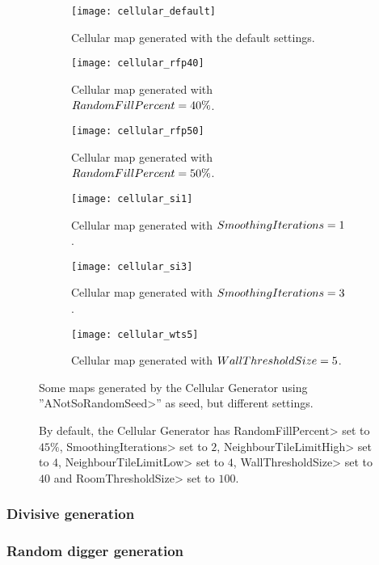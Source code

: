 \begin{figure}[tp]
	\centering
  	\begin{subfigure}[t]{0.325\linewidth}
		\texttt{[image: cellular\_default]}
     		\caption{Cellular map generated with the default settings.}
 	\end{subfigure}
  	\begin{subfigure}[t]{0.325\linewidth}
    		\texttt{[image: cellular\_rfp40]}
    		\caption{Cellular map generated with $Ran\-dom\-Fill\-Per\-cent = 40\%$.}
  	\end{subfigure}
  	\begin{subfigure}[t]{0.325\linewidth}
    		\texttt{[image: cellular\_rfp50]}
    		\caption{Cellular map generated with $Ran\-dom\-Fill\-Per\-cent = 50\%$.}
  	\end{subfigure}
  	\begin{subfigure}[t]{0.325\linewidth}
		\texttt{[image: cellular\_si1]}
     		\caption{Cellular map generated with $Smooth\-ing\-It\-er\-a\-tions = 1$.}
 	\end{subfigure}
  	\begin{subfigure}[t]{0.325\linewidth}
    		\texttt{[image: cellular\_si3]}
     		\caption{Cellular map generated with $Smooth\-ing\-It\-er\-a\-tions = 3$.}
  	\end{subfigure}
  	\begin{subfigure}[t]{0.325\linewidth}
    		\texttt{[image: cellular\_wts5]}
     		\caption{Cellular map generated with $Wall\-Thresh\-old\-Size = 5$.}
  	\end{subfigure}	
	\caption{Some maps generated by the Cellular Generator using ''\<ANotSoRandomSeed>'' as seed, but different settings.}
	\caption*{By default, the Cellular Generator has \<RandomFillPercent> set to $45\%$, \<SmoothingIterations> set to $2$,  \<NeighbourTileLimitHigh> set to $4$,  \<NeighbourTileLimitLow> set to $4$,  \<WallThresholdSize> set to $40$ and \<RoomThresholdSize> set to $100$.}
	\label{fig:cellulars}
\end{figure}

\subsubsection{Divisive generation}

\subsubsection{Random digger generation}

